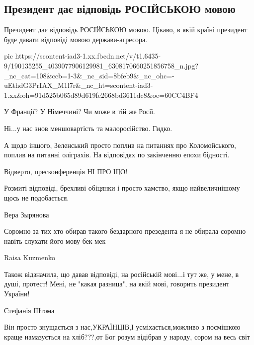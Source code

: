  
 
 
 
 
\subsection{Президент дає відповідь РОСІЙСЬКОЮ мовою}
\label{sec:20_05_2021.fb.smolij_andrij.1.zelja_jazyk_mova_press_konferencia}

Президент дає відповідь РОСІЙСЬКОЮ мовою. Цікаво, в якій країні президент буде
давати відповіді мовою держави-агресора. 

\ifcmt
  pic https://scontent-iad3-1.xx.fbcdn.net/v/t1.6435-9/190135255_4039077906129981_6308170660251856758_n.jpg?_nc_cat=108&ccb=1-3&_nc_sid=8bfeb9&_nc_ohc=-uEthdG3PrIAX_M1l7r&_nc_ht=scontent-iad3-1.xx&oh=91d525b065d89d619fe2668bd3611dc8&oe=60CC4BF4
\fi

У Франції? У Німеччині? Чи може в тій же Росії. 

Ні...у нас знов меншовартість та малоросійство. Гидко.

А щодо іншого, Зеленський просто поплив на питаннях про Коломойського, поплив
на питанні оліграхів. На відповідях по закінченню епохи бідності. 

Відверто, пресконференція НІ ПРО ЩО! 

Розмиті відповіді, брехливі обіцянки і просто хамство, якщо найвеличнішому щось
не подобається.

Вера Зырянова

Соромно за тих хто обирав такого бездарного презедента я не обирала соромно
навіть слухати його мову бек мек

Raisa Kuzmenko

Також відзначила, що давав відповіді, на російській мові...і тут же, у мене, в
душі, протест! Мені, не "какая разница", на якій мові, говорить президент
України!

Стефанія Штома

Він просто знущається з нас,УКРАЇНЦІВ,І усміхається,можливо з посмішкою краще
намазується на хліб???,от Бог розум відібрав у народу, сором на весь світ

